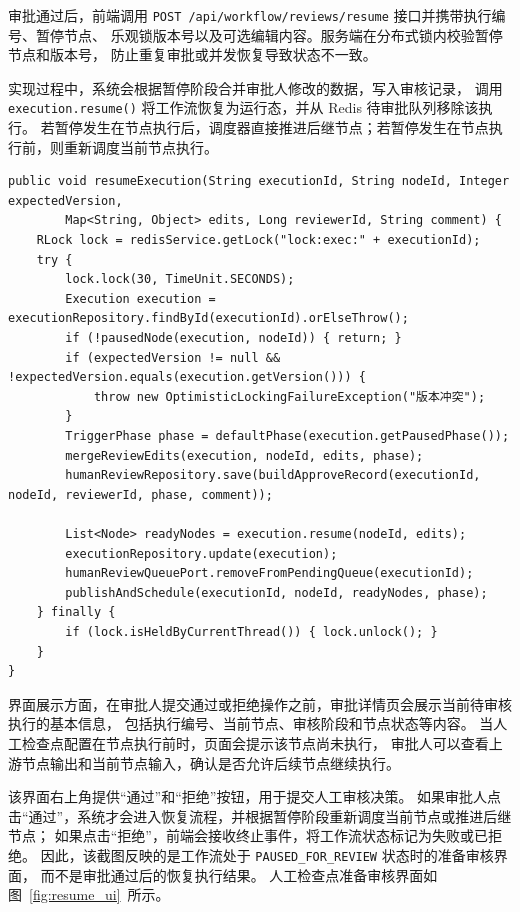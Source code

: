 审批通过后，前端调用 \texttt{POST /api/workflow/reviews/resume} 接口并携带执行编号、暂停节点、
乐观锁版本号以及可选编辑内容。服务端在分布式锁内校验暂停节点和版本号，
防止重复审批或并发恢复导致状态不一致。

实现过程中，系统会根据暂停阶段合并审批人修改的数据，写入审核记录，
调用 \texttt{execution.resume()} 将工作流恢复为运行态，并从 Redis 待审批队列移除该执行。
若暂停发生在节点执行后，调度器直接推进后继节点；若暂停发生在节点执行前，则重新调度当前节点执行。


\begin{lstlisting}[style=java, caption={SchedulerService.resumeExecution() 工作流恢复关键代码}]
public void resumeExecution(String executionId, String nodeId, Integer expectedVersion,
        Map<String, Object> edits, Long reviewerId, String comment) {
    RLock lock = redisService.getLock("lock:exec:" + executionId);
    try {
        lock.lock(30, TimeUnit.SECONDS);
        Execution execution = executionRepository.findById(executionId).orElseThrow();
        if (!pausedNode(execution, nodeId)) { return; }
        if (expectedVersion != null && !expectedVersion.equals(execution.getVersion())) {
            throw new OptimisticLockingFailureException("版本冲突");
        }
        TriggerPhase phase = defaultPhase(execution.getPausedPhase());
        mergeReviewEdits(execution, nodeId, edits, phase);
        humanReviewRepository.save(buildApproveRecord(executionId, nodeId, reviewerId, phase, comment));

        List<Node> readyNodes = execution.resume(nodeId, edits);
        executionRepository.update(execution);
        humanReviewQueuePort.removeFromPendingQueue(executionId);
        publishAndSchedule(executionId, nodeId, readyNodes, phase);
    } finally {
        if (lock.isHeldByCurrentThread()) { lock.unlock(); }
    }
}
\end{lstlisting}


界面展示方面，在审批人提交通过或拒绝操作之前，审批详情页会展示当前待审核执行的基本信息，
包括执行编号、当前节点、审核阶段和节点状态等内容。
当人工检查点配置在节点执行前时，页面会提示该节点尚未执行，
审批人可以查看上游节点输出和当前节点输入，确认是否允许后续节点继续执行。

该界面右上角提供“通过”和“拒绝”按钮，用于提交人工审核决策。
如果审批人点击“通过”，系统才会进入恢复流程，并根据暂停阶段重新调度当前节点或推进后继节点；
如果点击“拒绝”，前端会接收终止事件，将工作流状态标记为失败或已拒绝。
因此，该截图反映的是工作流处于 \texttt{PAUSED\_FOR\_REVIEW} 状态时的准备审核界面，
而不是审批通过后的恢复执行结果。
人工检查点准备审核界面如图~\ref{fig:resume_ui}~所示。

